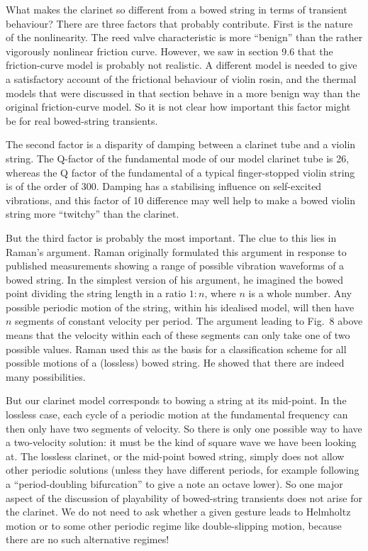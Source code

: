 
  What makes the clarinet so different from a bowed string in terms of 
  transient behaviour? There are three factors that probably contribute. First 
  is the nature of the nonlinearity. The reed valve characteristic is more 
  ``benign'' than the rather vigorously nonlinear friction curve. However, we 
  saw in section 9.6 that the friction-curve model is probably not realistic. A 
  different model is needed to give a satisfactory account of the frictional 
  behaviour of violin rosin, and the thermal models that were discussed in that 
  section behave in a more benign way than the original friction-curve model. 
  So it is not clear how important this factor might be for real bowed-string 
  transients. 

  The second factor is a disparity of damping between a clarinet tube and a 
  violin string. The Q-factor of the fundamental mode of our model clarinet 
  tube is 26, whereas the Q factor of the fundamental of a typical 
  finger-stopped violin string is of the order of 300. Damping has a 
  stabilising influence on self-excited vibrations, and this factor of 10 
  difference may well help to make a bowed violin string more “twitchy” than 
  the clarinet. 

  But the third factor is probably the most important. The clue to this lies in 
  Raman’s argument. Raman originally formulated this argument in response to 
  published measurements showing a range of possible vibration waveforms of a 
  bowed string. In the simplest version of his argument, he imagined the bowed 
  point dividing the string length in a ratio $1:n$, where $n$ is a whole 
  number. Any possible periodic motion of the string, within his idealised 
  model, will then have $n$ segments of constant velocity per period. The 
  argument leading to Fig.\ 8 above means that the velocity within each of 
  these segments can only take one of two possible values. Raman used this as 
  the basis for a classification scheme for all possible motions of a 
  (lossless) bowed string. He showed that there are indeed many possibilities. 

  But our clarinet model corresponds to bowing a string at its mid-point. In 
  the lossless case, each cycle of a periodic motion at the fundamental 
  frequency can then only have two segments of velocity. So there is only one 
  possible way to have a two-velocity solution: it must be the kind of square 
  wave we have been looking at. The lossless clarinet, or the mid-point bowed 
  string, simply does not allow other periodic solutions (unless they have 
  different periods, for example following a “period-doubling bifurcation” to 
  give a note an octave lower). So one major aspect of the discussion of 
  playability of bowed-string transients does not arise for the clarinet. We do 
  not need to ask whether a given gesture leads to Helmholtz motion or to some 
  other periodic regime like double-slipping motion, because there are no such 
  alternative regimes! 

